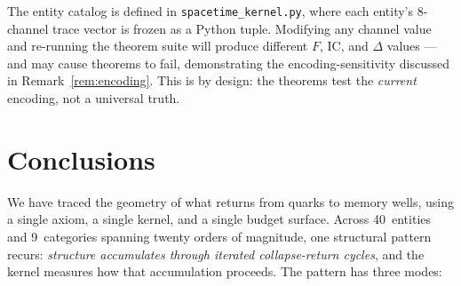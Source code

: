 \documentclass[
  aps,
  prd,
  twocolumn,
  superscriptaddress,
  nofootinbib,
  floatfix
]{revtex4-2}
\newcommand{\IC}{\mathrm{IC}}
\begin{document}
The entity catalog is defined in
\texttt{spacetime\_kernel.py}, where each entity's 8-channel
trace vector is frozen as a Python tuple.  Modifying any
channel value and re-running the theorem suite will produce
different $F$, $\IC$, and $\Delta$ values --- and may cause
theorems to fail, demonstrating the encoding-sensitivity
discussed in Remark~\ref{rem:encoding}.  This is by design:
the theorems test the \emph{current} encoding, not a
universal truth.


\section{Conclusions}\label{sec:conclusions}

We have traced the geometry of what returns from quarks to
memory wells, using a single axiom, a single kernel, and a
single budget surface.  Across 40~entities and 9~categories
spanning twenty orders of magnitude, one structural pattern
recurs: \emph{structure accumulates through iterated
collapse-return cycles}, and the kernel measures how that
accumulation proceeds.  The pattern has three modes:
\end{document}
